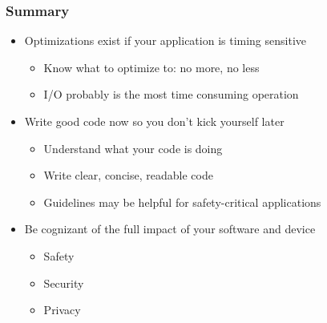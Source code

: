 \documentclass{beamer}
\begin{document}
\begin{frame}
\frametitle{Summary}
\begin{itemize}
  \item Optimizations exist if your application is timing sensitive
  \begin{itemize}
    \item Know what to optimize to: no more, no less
    \item I/O probably is the most time consuming operation
  \end{itemize}
  \item Write good code now so you don't kick yourself later
  \begin{itemize}
    \item Understand what your code is doing
    \item Write clear, concise, readable code
    \item Guidelines may be helpful for safety-critical applications
  \end{itemize}  
  \item Be cognizant of the full impact of your software and device
  \begin{itemize}
    \item Safety
    \item Security
    \item Privacy
  \end{itemize}  
\end{itemize}
\end{frame}
\end{document}
